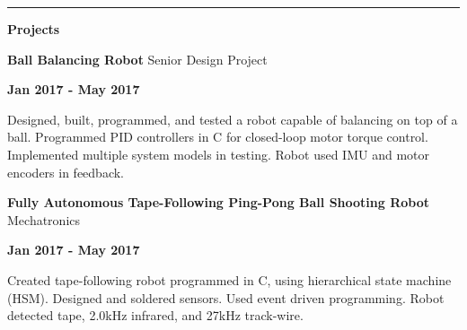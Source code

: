 \documentclass[paper=a4,fontsize=11pt]{article} %
\def \subSectionSpace   {0.25cm}     %
\def \leftColSpace      {0.1}       %
\def \middleColSpace    {0.73}       %
\def \bigMiddleColSpace {0.8}       %
\def \rightColSpace     {0.25}      %
\def \lineWidth         {20.25cm}   %
\def \lineThickness     {1pt}     %
\begin{document}
    \noindent\rule{\lineWidth}{\lineThickness}

    \noindent
    \begin{minipage}[t]{\leftColSpace\linewidth}
        \noindent \textbf{Projects}
    \end{minipage}
    \begin{minipage}[t]{\middleColSpace\linewidth}
        \noindent \textbf{Ball Balancing Robot } \quad Senior Design Project
    \end{minipage}
    \begin{minipage}[t]{\rightColSpace\linewidth}
        \noindent \textbf{Jan 2017 - May 2017}
    \end{minipage}

    \noindent
    \begin{minipage}[t]{\leftColSpace\linewidth}
        \hfill
    \end{minipage}
    \begin{minipage}[t]{\bigMiddleColSpace\linewidth}
        Designed, built, programmed, and tested a robot capable of balancing on top of a ball. Programmed PID controllers in C for closed-loop motor torque control. Implemented multiple system models in testing. Robot used IMU and motor encoders in feedback.
    \end{minipage}

    \vspace{\subSectionSpace}  
    \noindent
    \begin{minipage}[t]{\leftColSpace\linewidth}
        \noindent \hfill
    \end{minipage}
    \begin{minipage}[t]{\middleColSpace\linewidth}
        \noindent \textbf{Fully Autonomous Tape-Following Ping-Pong Ball Shooting Robot} \quad Mechatronics
    \end{minipage}
    \begin{minipage}[t]{\rightColSpace\linewidth}
        \noindent \textbf{Jan 2017 - May 2017}
    \end{minipage}


    \noindent
    \begin{minipage}[t]{\leftColSpace\linewidth}
        \hfill
    \end{minipage}
    \begin{minipage}[t]{\bigMiddleColSpace\linewidth}
        Created tape-following robot programmed in C, using hierarchical state machine (HSM). Designed and soldered sensors. Used event driven programming. Robot detected tape, 2.0kHz infrared, and 27kHz track-wire.
    \end{minipage}
\end{document}
